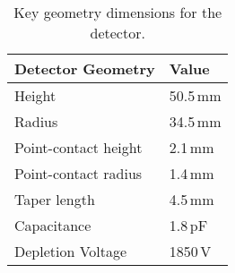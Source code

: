 \begin{table}[htb]
\centering
\begin{tabular}{|l | l|}
\hline
Detector Geometry   & Value \\
\hline
Height      & 50.5\,mm  \\
Radius             & 34.5\,mm  \\
Point-contact height          & 2.1\,mm   \\
Point-contact radius         & 1.4\,mm   \\
Taper length               & 4.5\,mm   \\
Capacitance & 1.8\,pF \\
Depletion Voltage & 1850\,V \\
\hline
\end{tabular}
\caption{Key geometry dimensions for the {\ponama} detector.}
\label{ch5_5_tab_ponama1_geometry}
\end{table}

